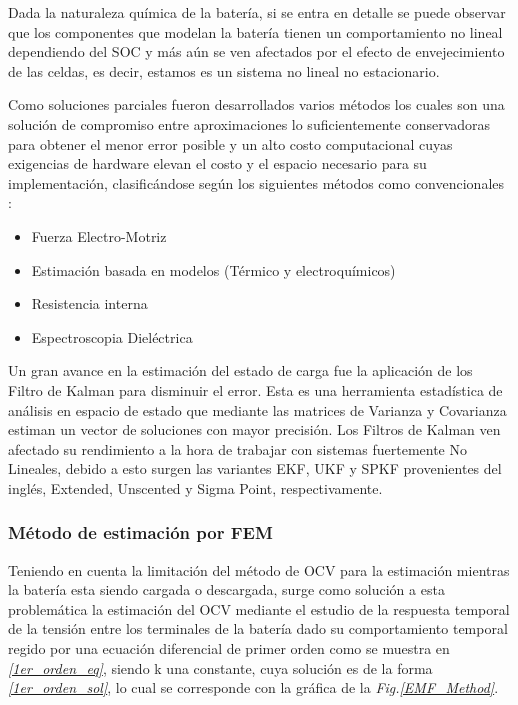 \documentclass[10pt,a4paper]{article}
\begin{document}
Dada la naturaleza química de la batería, si se entra en detalle se puede
observar que los componentes que modelan la batería tienen un comportamiento no
lineal dependiendo del \acrshort{SOC} y más aún se ven afectados por el efecto
de envejecimiento de las celdas, es decir, estamos es un sistema no lineal no
estacionario.

Como soluciones parciales fueron desarrollados varios métodos los cuales son una
solución de compromiso entre aproximaciones lo suficientemente conservadoras
para obtener el menor error posible y un alto costo computacional cuyas
exigencias de hardware elevan el costo y el espacio necesario para su
implementación, clasificándose según \cite{Hannan2017} los siguientes métodos
como convencionales :

\begin{itemize}
    \item Fuerza Electro-Motriz
    \item Estimación basada en modelos (Térmico y electroquímicos)
    \item Resistencia interna
    \item Espectroscopia Dieléctrica
\end{itemize}

Un gran avance en la estimación del estado de carga fue la aplicación de los
Filtro de Kalman para disminuir el error. Esta es una herramienta estadística de
análisis en espacio de estado que mediante las matrices de Varianza y Covarianza
estiman un vector de soluciones con mayor precisión.  Los Filtros de Kalman ven
afectado su rendimiento a la hora de trabajar con sistemas fuertemente No
Lineales, debido a esto surgen las variantes EKF, UKF y SPKF provenientes del
inglés, Extended, Unscented y Sigma Point, respectivamente.

\subsubsection{Método de estimación por FEM}

Teniendo en cuenta la limitación del método de \acrshort{OCV} para la estimación
mientras la batería esta siendo cargada o descargada, surge como solución a esta
problemática la estimación del \acrshort{OCV} mediante el estudio de la
respuesta temporal de la tensión entre los terminales de la batería dado su
comportamiento temporal regido por una ecuación diferencial de primer orden como
se muestra en \emph{\ref{1er_orden_eq}}, siendo k una constante, cuya solución
es de la forma \emph{\ref{1er_orden_sol}}, lo cual se corresponde con la gráfica
de la \emph{Fig.\ref{EMF_Method}}.
\end{document}
